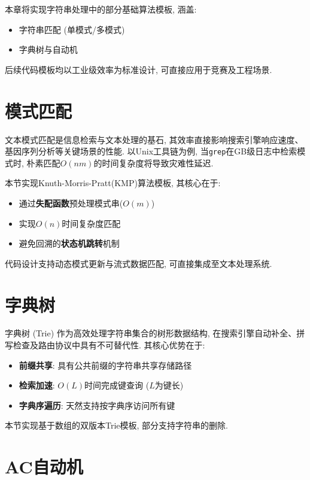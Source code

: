 \documentclass[a4paper]{ctexbook}
\begin{document}
本章将实现字符串处理中的部分基础算法模板, 涵盖:
\begin{itemize}
	\item 字符串匹配 (单模式/多模式)
	\item 字典树与自动机
\end{itemize}

后续代码模板均以工业级效率为标准设计, 可直接应用于竞赛及工程场景.

\section{模式匹配}

文本模式匹配是信息检索与文本处理的基石, 其效率直接影响搜索引擎响应速度、基因序列分析等关键场景的性能. 以Unix工具链为例, 当\texttt{grep}在GB级日志中检索模式时, 朴素匹配$O(nm)$的时间复杂度将导致灾难性延迟.

本节实现Knuth-Morris-Pratt(KMP)算法模板, 其核心在于:
\begin{itemize}
	\item 通过\textbf{失配函数}预处理模式串($O(m)$)
	\item 实现$O(n)$时间复杂度匹配
	\item 避免回溯的\textbf{状态机跳转}机制
\end{itemize}
代码设计支持动态模式更新与流式数据匹配, 可直接集成至文本处理系统.



\section{字典树}

字典树 (Trie) 作为高效处理字符串集合的树形数据结构, 在搜索引擎自动补全、拼写检查及路由协议中具有不可替代性. 其核心优势在于:
\begin{itemize}
	\item \textbf{前缀共享}: 具有公共前缀的字符串共享存储路径
	\item \textbf{检索加速}: $O(L)$时间完成键查询 ($L$为键长)
	\item \textbf{字典序遍历}: 天然支持按字典序访问所有键
\end{itemize}

本节实现基于数组的双版本Trie模板, 部分支持字符串的删除.



\section{AC自动机}
\end{document}
